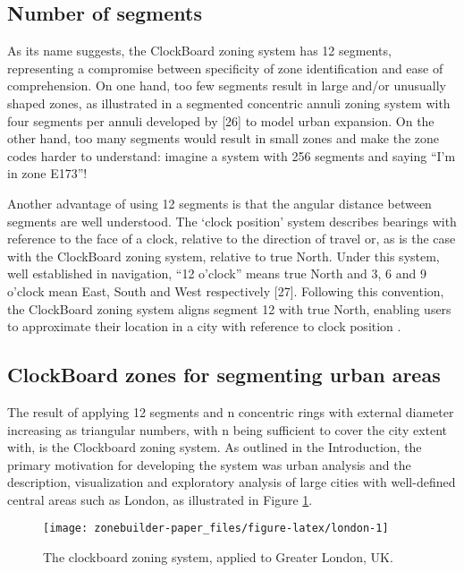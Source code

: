 \documentclass{josis}
\begin{document}
\hypertarget{number-of-segments}{%
\subsection{Number of segments}\label{number-of-segments}}

As its name suggests, the ClockBoard zoning system has 12 segments, representing a compromise between specificity of zone identification and ease of comprehension.
On one hand, too few segments result in large and/or unusually shaped zones, as illustrated in a segmented concentric annuli zoning system with four segments per annuli developed by {[}26{]} to model urban expansion.
On the other hand, too many segments would result in small zones and make the zone codes harder to understand: imagine a system with 256 segments and saying ``I'm in zone E173''!

Another advantage of using 12 segments is that the angular distance between segments are well understood.
The `clock position' system describes bearings with reference to the face of a clock, relative to the direction of travel or, as is the case with the ClockBoard zoning system, relative to true North.
Under this system, well established in navigation, ``12 o'clock'' means true North and 3, 6 and 9 o'clock mean East, South and West respectively {[}27{]}.
Following this convention, the ClockBoard zoning system aligns segment 12 with true North, enabling users to approximate their location in a city with reference to clock position .

\hypertarget{clockboard-zones-for-segmenting-urban-areas}{%
\subsection{ClockBoard zones for segmenting urban areas}\label{clockboard-zones-for-segmenting-urban-areas}}

The result of applying 12 segments and n concentric rings with external diameter increasing as triangular numbers, with n being sufficient to cover the city extent with, is the Clockboard zoning system.
As outlined in the Introduction, the primary motivation for developing the system was urban analysis and the description, visualization and exploratory analysis of large cities with well-defined central areas such as London, as illustrated in Figure \ref{fig:london}.

\begin{figure}

{\centering \texttt{[image: zonebuilder-paper\_files/figure-latex/london-1]} 

}

\caption{The clockboard zoning system, applied to Greater London, UK.}\label{fig:london}
\end{figure}
\end{document}
